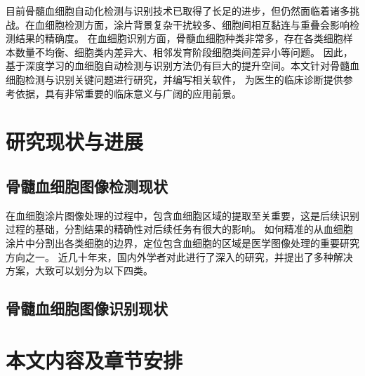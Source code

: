 目前骨髓血细胞自动化检测与识别技术已取得了长足的进步，但仍然面临着诸多挑战。在血细胞检测方面，涂片背景复杂干扰较多、细胞间相互黏连与重叠会影响检测结果的精确度。
在血细胞识别方面，骨髓血细胞种类非常多，存在各类细胞样本数量不均衡、细胞类内差异大、相邻发育阶段细胞类间差异小等问题。
因此，基于深度学习的血细胞自动检测与识别方法仍有巨大的提升空间。本文针对骨髓血细胞检测与识别关键问题进行研究，并编写相关软件，
为医生的临床诊断提供参考依据，具有非常重要的临床意义与广阔的应用前景。



\section{研究现状与进展}
\subsection{骨髓血细胞图像检测现状}
在血细胞涂片图像处理的过程中，包含血细胞区域的提取至关重要，这是后续识别过程的基础，分割结果的精确性对后续任务有很大的影响。
如何精准的从血细胞涂片中分割出各类细胞的边界，定位包含血细胞的区域是医学图像处理的重要研究方向之一。
近几十年来，国内外学者对此进行了深入的研究，并提出了多种解决方案，大致可以划分为以下四类。
\subsection{骨髓血细胞图像识别现状}
\section{本文内容及章节安排}

